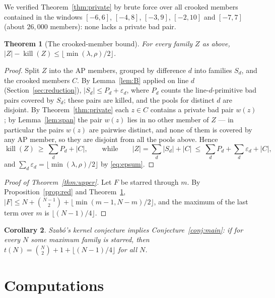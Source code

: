 \documentclass[11pt]{article}
\newtheorem{theorem}{Theorem}[section]
\newtheorem{corollary}[theorem]{Corollary}
\theoremstyle{definition}
\newcommand{\killop}{\operatorname{kill}}
\begin{document}
We verified Theorem~\ref{thm:private} by brute force over all crooked members contained in the windows $[-6,6]$, $[-4,8]$, $[-3,9]$, $[-2,10]$ and $[-7,7]$ (about $26{,}000$ members): none lacks a private bad pair.

\begin{theorem}[The crooked-member bound]\label{thm:lemA}
For every family $Z$ as above, $|Z|-\killop(Z)\le\lfloor\min(\lambda,\rho)/2\rfloor$.
\end{theorem}

\begin{proof}
Split $Z$ into the AP members, grouped by difference $d$ into families $S_d$, and the crooked members $C$. By Lemma~\ref{lem:B} applied on line $d$ (Section~\ref{sec:reduction}), $|S_d|\le P_d+\varepsilon_d$, where $P_d$ counts the line-$d$-primitive bad pairs covered by $S_d$; these pairs are killed, and the pools for distinct $d$ are disjoint. By Theorem~\ref{thm:private} each $z\in C$ contains a private bad pair $w(z)$; by Lemma~\ref{lem:span} the pair $w(z)$ lies in no other member of $Z$ --- in particular the pairs $w(z)$ are pairwise distinct, and none of them is covered by any AP member, so they are disjoint from all the pools above. Hence
\[ \killop(Z)\ \ge\ \sum_d P_d+|C|,\qquad\text{while}\qquad |Z|=\sum_d|S_d|+|C|\ \le\ \sum_d P_d+\sum_d\varepsilon_d+|C|, \]
and $\sum_d\varepsilon_d=\lfloor\min(\lambda,\rho)/2\rfloor$ by \eqref{eq:epsum}.
\end{proof}

\begin{proof}[Proof of Theorem~\ref{thm:upper}]
Let $F$ be starred through $m$. By Proposition~\ref{prop:red} and Theorem~\ref{thm:lemA}, $|F|\le N+\binom{N-1}2+\lfloor\min(m-1,N-m)/2\rfloor$, and the maximum of the last term over $m$ is $\lfloor(N-1)/4\rfloor$.
\end{proof}

\begin{corollary}\label{cor:kernel}
Szab\'o's kernel conjecture implies Conjecture~\ref{conj:main}: if for every $N$ some maximum family is starred, then $t(N)=\binom N2+1+\lfloor(N-1)/4\rfloor$ for all $N$.
\end{corollary}

\section{Computations}\label{sec:comp}
\end{document}
